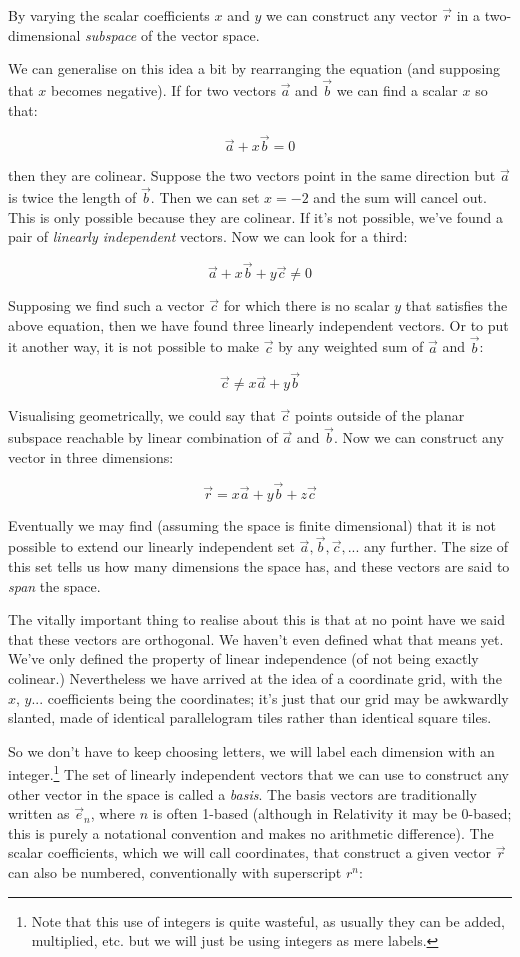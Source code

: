 By varying the scalar coefficients $x$ and $y$ we can construct any vector $\vec{r}$ in a two-dimensional \textit{subspace} of the vector space.

We can generalise on this idea a bit by rearranging the equation (and supposing that $x$ becomes negative). If for two vectors $\vec{a}$ and $\vec{b}$ we can find a scalar ${x}$ so that:

$$ 
\vec{a} + x \vec{b} = 0
$$

then they are colinear. Suppose the two vectors point in the same direction but $\vec{a}$ is twice the length of $\vec{b}$. Then we can set $x = -2$ and the sum will cancel out. This is only possible because they are colinear. If it's not possible, we've found a pair of \textit{linearly independent} vectors. Now we can look for a third:

$$ 
\vec{a} + x \vec{b} + y \vec{c} \ne 0
$$

Supposing we find such a vector $\vec{c}$ for which there is no scalar $y$ that satisfies the above equation, then we have found three linearly independent vectors. Or to put it another way, it is not possible to make $\vec{c}$ by any weighted sum of $\vec{a}$ and $\vec{b}$:

$$
\vec{c} \ne x \vec{a} + y \vec{b}
$$

Visualising geometrically, we could say that $\vec{c}$ points outside of the planar subspace reachable by linear combination of $\vec{a}$ and $\vec{b}$. Now we can construct any vector in three dimensions:

$$
\vec{r} = x \vec{a} + y \vec{b} + z \vec{c}
$$

Eventually we may find (assuming the space is finite dimensional) that it is not possible to extend our linearly independent set $\vec{a}, \vec{b}, \vec{c}, ...$ any further. The size of this set tells us how many dimensions the space has, and these vectors are said to \textit{span} the space.

The vitally important thing to realise about this is that at no point have we said that these vectors are orthogonal. We haven't even defined what that means yet. We've only defined the property of linear independence (of not being exactly colinear.) Nevertheless we have arrived at the idea of a coordinate grid, with the $x$, $y$... coefficients being the coordinates; it's just that our grid may be awkwardly slanted, made of identical parallelogram tiles rather than identical square tiles.

So we don't have to keep choosing letters, we will label each dimension with an integer.\footnote{Note that this use of integers is quite wasteful, as usually they can be added, multiplied, etc. but we will just be using integers as mere labels.} The set of linearly independent vectors that we can use to construct any other vector in the space is called a \textit{basis}. The basis vectors are traditionally written as $\vec{e}_n$, where $n$ is often 1-based (although in Relativity it may be 0-based; this is purely a notational convention and makes no arithmetic difference). The scalar coefficients, which we will call coordinates, that construct a given vector $\vec{r}$ can also be numbered, conventionally with superscript $r^n$:


